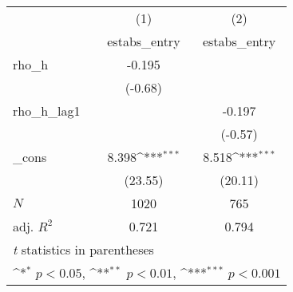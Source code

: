 {
\def\sym#1{\ifmmode^{#1}\else\(^{#1}\)\fi}
\begin{tabular}{l*{2}{c}}
\toprule
            &\multicolumn{1}{c}{(1)}&\multicolumn{1}{c}{(2)}\\
            &\multicolumn{1}{c}{estabs\_entry}&\multicolumn{1}{c}{estabs\_entry}\\
\midrule
rho\_h       &      -0.195         &                     \\
            &     (-0.68)         &                     \\
\addlinespace
rho\_h\_lag1  &                     &      -0.197         \\
            &                     &     (-0.57)         \\
\addlinespace
\_cons      &       8.398\sym{***}&       8.518\sym{***}\\
            &     (23.55)         &     (20.11)         \\
\midrule
\(N\)       &        1020         &         765         \\
adj. \(R^{2}\)&       0.721         &       0.794         \\
\bottomrule
\multicolumn{3}{l}{\footnotesize \textit{t} statistics in parentheses}\\
\multicolumn{3}{l}{\footnotesize \sym{*} \(p<0.05\), \sym{**} \(p<0.01\), \sym{***} \(p<0.001\)}\\
\end{tabular}
}
